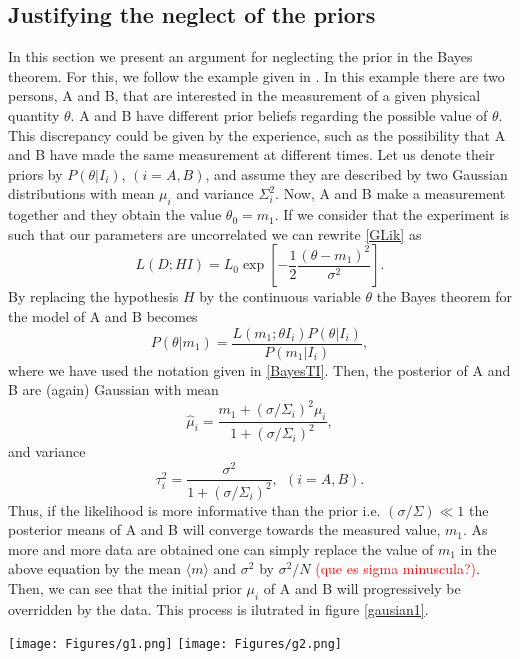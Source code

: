 \documentclass[onecolumn,           %
               showpacs,            %
               preprintnumbers,     %
               aps,                 %
               prl,          	    %
               letterpaper,             %
               superscriptaddress,      %
               nofootinbib,         %
               tightenlines,        %
               floats,floatfix      %
               ,usenatbib,
               ]{revtex4-1}
\begin{document}
\subsection{Justifying the neglect of the priors}

In this section we present an argument for neglecting the prior in the Bayes theorem. For this, we follow the example given in \cite{RobT}. In this example there are two persons, A and B, that are interested in the measurement of a given physical quantity $\theta$. A and B have different prior beliefs regarding the possible value of $\theta$. This discrepancy could be given by the experience, such as the possibility that A and B have made the same measurement at different times. Let us denote their priors by $P(\theta|I_i)$, $(i=A,B)$, and assume they are described by two Gaussian distributions with mean $\mu_i$ and variance $\Sigma_i^2$. Now, A and B make a measurement together and they obtain the value $\theta_0=m_1$. If we consider that the experiment is such that our parameters are uncorrelated we can rewrite \eqref{GLik} as
\begin{equation}\label{LikG}
L(D;HI)=L_0\exp\left[-\frac{1}{2}\frac{(\theta-m_1)^2}{\sigma^2}\right].
\end{equation}
By replacing the hypothesis $H$ by the continuous variable $\theta$ the Bayes theorem for the model of A and B becomes
\begin{equation}
P(\theta|m_1)=\frac{L(m_1;\theta I_i)P(\theta|I_i)}{P(m_1|I_i)},
\end{equation}
where we have used the notation given in \eqref{BayesTI}. Then, the posterior of A and B are (again) Gaussian with mean
\begin{equation}
\hat \mu_i = \frac{m_1+(\sigma/\Sigma_i)^2\mu_i}{1+(\sigma/\Sigma_i)^2},
\end{equation}
and variance 
\begin{equation}
\tau_i^2=\frac{\sigma^2}{1+(\sigma/\Sigma_i)^2}, \ \ (i=A,B).
\end{equation}
Thus, if the likelihood is more informative than the prior i.e. $(\sigma/\Sigma)\ll 1$ the posterior means of A and B will converge towards the measured value, $m_1$. As more and more data are obtained one can simply replace the value of $m_1$ in the above equation by the mean $\langle m\rangle$ and $\sigma^2$ by $\sigma^2/N$ \textcolor{red}{(que es sigma minuscula?)}. Then, we can see that the initial prior $\mu_i$ of A and B will progressively be overridden by the data. This process is ilutrated in figure \ref{gausian1}.
\begin{minipage}{\textwidth}
\centering
\texttt{[image: Figures/g1.png]}
\texttt{[image: Figures/g2.png]}
\label{gausian1}
\end{minipage}
\end{document}

